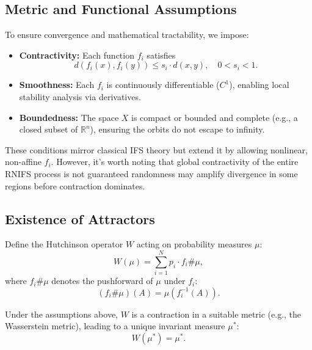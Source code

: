 \documentclass[twocolumn,10pt]{article}
\begin{document}
\subsection{Metric and Functional Assumptions}
\label{subsec:assumptions}

To ensure convergence and mathematical tractability, we impose:

\begin{itemize}
    \item[(A1)] \textbf{Contractivity:} Each function $f_i$ satisfies
    \begin{equation}
    d(f_i(x), f_i(y)) \leq s_i \cdot d(x, y), \quad 0 < s_i < 1.
    \label{eq:contraction}
    \end{equation}
    
    \item[(A2)] \textbf{Smoothness:} Each $f_i$ is continuously differentiable ($C^1$), enabling local stability analysis via derivatives.
    
    \item[(A3)] \textbf{Boundedness:} The space $X$ is compact or bounded and complete (e.g., a closed subset of $\mathbb{R}^n$), ensuring the orbits do not escape to infinity.
\end{itemize}

These conditions mirror classical IFS theory but extend it by allowing nonlinear, non-affine $f_i$. However, it's worth noting that global contractivity of the entire RNIFS process is not guaranteed randomness may amplify divergence in some regions before contraction dominates.


\subsection{Existence of Attractors}
\label{subsec:attractor}

Define the Hutchinson operator $W$ acting on probability measures $\mu$:
\begin{equation}
W(\mu) = \sum_{i=1}^N p_i \cdot f_i \# \mu,
\label{eq:hutchinson_operator}
\end{equation}
where $f_i \# \mu$ denotes the pushforward of $\mu$ under $f_i$:
\[
(f_i \# \mu)(A) = \mu(f_i^{-1}(A)).
\]

Under the assumptions above, $W$ is a contraction in a suitable metric (e.g., the Wasserstein metric), leading to a unique invariant measure $\mu^*$:
\begin{equation}
W(\mu^*) = \mu^*.
\label{eq:invariant_measure}
\end{equation}
\end{document}
